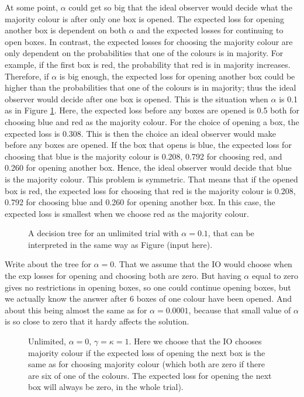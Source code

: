 At some point, $\alpha$ could get so big that the ideal observer would decide what the majority colour is after only one box is opened. The expected loss for opening another box is dependent on both $\alpha$ and the expected losses for continuing to open boxes. In contrast, the expected losses for choosing the majority colour are only dependent on the probabilities that one of the colours is in majority. For example, if the first box is red, the probability that red is in majority increases. Therefore, if $\alpha$ is big enough, the expected loss for opening another box could be higher than the probabilities that one of the colours is in majority; thus the ideal observer would decide after one box is opened. This is the situation when $\alpha$ is 0.1 as in Figure \ref{fig:unlim_a0.1_gk1}. Here, the expected loss before any boxes are opened is 0.5 both for choosing blue and red as the majority colour. For the choice of opening a box, the expected loss is 0.308. This is then the choice an ideal observer would make before any boxes are opened. If the box that opens is blue, the expected loss for choosing that blue is the majority colour is 0.208, 0.792 for choosing red, and 0.260 for opening another box. Hence, the ideal observer would decide that blue is the majority colour. This problem is symmetric. That means that if the opened box is red, the expected loss for choosing that red is the majority colour is 0.208, 0.792 for choosing blue and 0.260 for opening another box. In this case, the expected loss is smallest when we choose red as the majority colour.
\begin{figure}
    \centering
    \scalebox{1}{}
    \caption[IO solution, unlimited. $\alpha=0.1$,$\gamma=\kappa=1$]{A decision tree for an unlimited trial with $\alpha = 0.1$, that can be interpreted in the same way as Figure (input here).}
    \label{fig:unlim_a0.1_gk1}
\end{figure}


Write about the tree for $\alpha=0$. 
That we assume that the IO would choose when the exp losses for opening and choosing both are zero. But having $\alpha$ equal to zero gives no restrictions in opening boxes, so one could continue opening boxes, but we actually know the answer after 6 boxes of one colour have been opened. And about this being almost the same as for $\alpha=0.0001$, because that small value of $\alpha$ is so close to zero that it hardy affects the solution. 
\begin{figure}
    \centering
    \scalebox{0.5}{}
    \caption[IO solution, unlimited. $\alpha=0$, $\gamma=\kappa=1$]{Unlimited, $\alpha = 0$, $\gamma=\kappa=1$. Here we choose that the IO chooses majority colour if the expected loss of opening the next box is the same as for choosing majority colour (which both are zero if there are six of one of the colours. The expected loss for opening the next box will always be zero, in the whole trial).}
    \label{fig:unlim_a0_gk1}
\end{figure}

